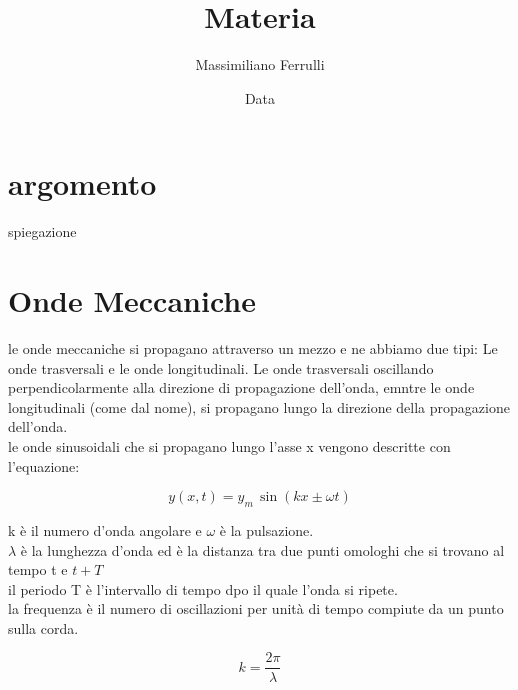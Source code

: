 \documentclass[a4paper,11pt]{article}
\begin{document}
\title{Materia}

\author{Massimiliano Ferrulli}
\date{Data}



\maketitle

\section*{argomento}
spiegazione

\pagebreak




\tableofcontents





\pagebreak





\section{Onde Meccaniche}

le onde meccaniche si propagano attraverso un mezzo e ne abbiamo due tipi: Le onde trasversali e le onde longitudinali.
Le onde trasversali oscillando perpendicolarmente alla direzione di propagazione dell'onda, emntre le onde longitudinali (come dal nome), si propagano lungo la direzione della propagazione dell'onda.
\\
le onde sinusoidali che si propagano lungo l'asse x vengono descritte con l'equazione: 
    \begin{center}
    \[
    y(x,t) = y_m \, \sin(kx \pm  \omega t)    
    \]
    \end{center}

k è il numero d'onda angolare e \( \omega \) è la pulsazione. 
\\
\( \lambda\) è la lunghezza d'onda ed è la distanza tra due punti omologhi che si trovano al tempo t e \( t + T\) 
\\
il periodo T è l'intervallo di tempo dpo il quale l'onda si ripete.
\\
la frequenza è il numero di oscillazioni per unità di tempo compiute da un punto sulla corda. 

    \begin{center}
    \[
    k = \frac{2 \pi}{\lambda}
    \]
    \end{center}
\end{document}

